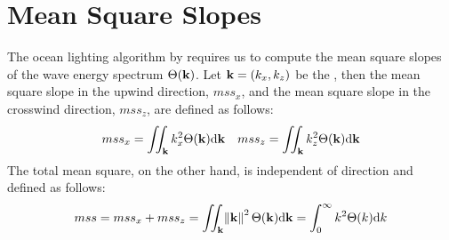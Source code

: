 \section{Mean Square Slopes}
\label{app:mss}
%
The ocean lighting algorithm by \cite{misc:oceanlightingfft} requires us to compute
the mean square slopes of the wave energy spectrum $\Theta(\mathbf{k})$.
Let $\mathbf{k} = (k_x, k_z)$ be the \wavevector,
then the mean square slope in the upwind direction, $mss_x$, and the mean square
slope in the crosswind direction, $mss_z$, are defined as follows:
\begin{align}
mss_x = \iint_{\mathbf{k}} k_x^2 \Theta(\mathbf{k}) \mathrm{d}\mathbf{k} &&
mss_z = \iint_{\mathbf{k}} k_z^2 \Theta(\mathbf{k}) \mathrm{d}\mathbf{k}
\end{align}
%
The total mean square, on the other hand, is independent of direction
and defined as follows:
\begin{equation}
mss = mss_x + mss_z = \iint_{\mathbf{k}} \norm{\mathbf{k}}^2 \Theta(\mathbf{k}) \mathrm{d}\mathbf{k} = \int_{0}^{\infty}k^2 \Theta(k)\mathrm{d}k
\end{equation}